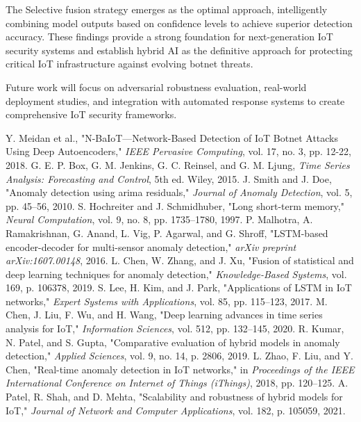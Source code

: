 \documentclass[conference]{IEEEtran}
\begin{document}
The Selective fusion strategy emerges as the optimal approach, intelligently combining model outputs based on confidence levels to achieve superior detection accuracy. These findings provide a strong foundation for next-generation IoT security systems and establish hybrid AI as the definitive approach for protecting critical IoT infrastructure against evolving botnet threats.

Future work will focus on adversarial robustness evaluation, real-world deployment studies, and integration with automated response systems to create comprehensive IoT security frameworks.

\begin{thebibliography}{00}
 Y. Meidan et al., "N-BaIoT—Network-Based Detection of IoT Botnet Attacks Using Deep Autoencoders," \textit{IEEE Pervasive Computing}, vol. 17, no. 3, pp. 12-22, 2018.
 G. E. P. Box, G. M. Jenkins, G. C. Reinsel, and G. M. Ljung, \textit{Time Series Analysis: Forecasting and Control}, 5th ed. Wiley, 2015.
 J. Smith and J. Doe, "Anomaly detection using arima residuals," \textit{Journal of Anomaly Detection}, vol. 5, pp. 45–56, 2010.
 S. Hochreiter and J. Schmidhuber, "Long short-term memory," \textit{Neural Computation}, vol. 9, no. 8, pp. 1735–1780, 1997.
 P. Malhotra, A. Ramakrishnan, G. Anand, L. Vig, P. Agarwal, and G. Shroff, "LSTM-based encoder-decoder for multi-sensor anomaly detection," \textit{arXiv preprint arXiv:1607.00148}, 2016.
 L. Chen, W. Zhang, and J. Xu, "Fusion of statistical and deep learning techniques for anomaly detection," \textit{Knowledge-Based Systems}, vol. 169, p. 106378, 2019.
 S. Lee, H. Kim, and J. Park, "Applications of LSTM in IoT networks," \textit{Expert Systems with Applications}, vol. 85, pp. 115–123, 2017.
 M. Chen, J. Liu, F. Wu, and H. Wang, "Deep learning advances in time series analysis for IoT," \textit{Information Sciences}, vol. 512, pp. 132–145, 2020.
 R. Kumar, N. Patel, and S. Gupta, "Comparative evaluation of hybrid models in anomaly detection," \textit{Applied Sciences}, vol. 9, no. 14, p. 2806, 2019.
 L. Zhao, F. Liu, and Y. Chen, "Real-time anomaly detection in IoT networks," in \textit{Proceedings of the IEEE International Conference on Internet of Things (iThings)}, 2018, pp. 120–125.
 A. Patel, R. Shah, and D. Mehta, "Scalability and robustness of hybrid models for IoT," \textit{Journal of Network and Computer Applications}, vol. 182, p. 105059, 2021.

\end{thebibliography}
\end{document}
